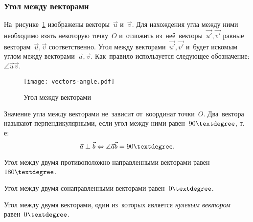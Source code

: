 \documentclass[]{scrartcl}
\begin{document}
\subsubsection{Угол между векторами}
На~рисунке~\ref{fig:vec-angle} изображены векторы~${\textstyle \vec{u}}$ и~${\textstyle \vec{v}}$. Для нахождения угла между ними необходимо взять некоторую точку~${\textstyle O}$ и~отложить из~неё~векторы~${\textstyle \vec{u'},\vec{v'}}$ равные векторам~${\textstyle \vec{u},\vec{v}}$ соответственно. Угол между векторами~${\textstyle \vec{u'},\vec{v'}}$ и~будет искомым углом между векторами~${\textstyle \vec{u},\vec{v}}$. Как~правило используется следующее обозначение: ${\textstyle \angle \vec{u} \vec{v}}$.
\begin{figure}[ht]
	\centering %
	\texttt{[image: vectors-angle.pdf]}
	\caption{Угол между векторами}\label{fig:vec-angle}
\end{figure}
Значение угла между векторами не~зависит от~координат точки~${\textstyle O}$. Два~вектора называют перпендикулярными, если угол между ними равен~${\textstyle 90\textdegree}$, т.\,е:
\begin{equation}\label{eq:perpendicular-vectors}
\vec{a} \perp \vec{b} \Leftrightarrow \angle \vec{a} \vec{b} = 90 \textdegree.
\end{equation}
\begin{proposition}
	Угол между двумя противоположно направленными векторами равен~${\textstyle 180\textdegree}$.
\end{proposition}
\begin{proposition}
	Угол между двумя сонаправленными векторами равен~${\textstyle 0\textdegree}$.
\end{proposition}
\begin{proposition}
	Угол между двумя векторами, один из~которых является \emph{нулевым вектором} равен~${\textstyle 0\textdegree}$.
\end{proposition}
\end{document}
